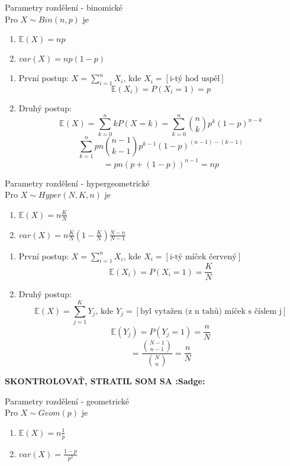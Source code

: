 \documentclass[../main.tex]{subfiles}
\begin{document}
\begin{theorem}
    Parametry rozdělení - binomické\\

    Pro $X\sim Bin(n,p)$ je
    \begin{enumerate}
        \item $\mathbb{E}(X) = np$
        \item $var(X) = np(1-p)$
    \end{enumerate}
    \begin{enumerate}
        \item První postup: $X = \sum^n_{i=1}X_i$, kde $X_i = [\text{i-tý hod uspěl}]$
        \[\mathbb{E}(X_i) = P(X_i = 1) = p\]
        \item Druhý postup:
        \[\mathbb{E}(X) = \sum^n_{k=0} kP(X=k) = \sum^n_{k=0}\binom{n}{k}p^k(1-p)^{n-k}\]
        \[\sum_{k=1}^n pn \binom{n-1}{k-1}p^{k-1}(1-p)^{(n-1) - (k-1)}\]
        \[ = pn (p + (1-p))^{n-1} = np\]
    \end{enumerate}
\end{theorem}

\begin{theorem}
    Parametry rozdělení - hypergeometrické\\

    Pro $X\sim Hyper(N,K,n)$ je
    \begin{enumerate}
        \item $\mathbb{E}(X) = n\frac{K}{N}$
        \item $var(X) = n\frac{K}{N}(1-\frac{K}{N})\frac{N-n}{N-1}$
    \end{enumerate}
    \begin{enumerate}
        \item První postup: $X = \sum^n_{i=1}X_i$, kde $X_i = [\text{i-tý míček červený}]$
        \[\mathbb{E}(X_i) = P(X_i = 1) = \frac{K}{N}\]
        \item Druhý postup:
        \[\mathbb{E}(X) = \sum^K_{j=1} Y_j\text{, kde } Y_j = [\text{byl vytažen (z n tahů) míček s číslem j}]\]
        \[\mathbb{E}(Y_j) = P(Y_j = 1) = \frac{n}{N} \]
        \[= \frac{\binom{N-1}{n-1}}{\binom{N}{n}} = \frac{n}{N}\]
    \end{enumerate}
    \textbf{SKONTROLOVAŤ, STRATIL SOM SA :Sadge:}
\end{theorem}

\begin{theorem}
    Parametry rozdělení - geometrické\\

    Pro $X\sim Geom(p)$ je
    \begin{enumerate}
        \item $\mathbb{E}(X) = n\frac{1}{p}$
        \item $var(X) = \frac{1-p}{p^2}$
    \end{enumerate}
\end{theorem}
\end{document}
